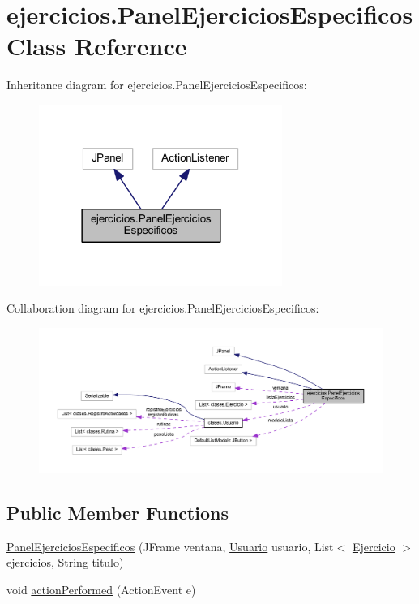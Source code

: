 \hypertarget{classejercicios_1_1_panel_ejercicios_especificos}{}\section{ejercicios.\+Panel\+Ejercicios\+Especificos Class Reference}
\label{classejercicios_1_1_panel_ejercicios_especificos}


Inheritance diagram for ejercicios.\+Panel\+Ejercicios\+Especificos\+:
\nopagebreak
\begin{figure}[H]
\begin{center}
\leavevmode
\includegraphics[width=225pt]{classejercicios_1_1_panel_ejercicios_especificos__inherit__graph}
\end{center}
\end{figure}


Collaboration diagram for ejercicios.\+Panel\+Ejercicios\+Especificos\+:
\nopagebreak
\begin{figure}[H]
\begin{center}
\leavevmode
\includegraphics[width=350pt]{classejercicios_1_1_panel_ejercicios_especificos__coll__graph}
\end{center}
\end{figure}
\subsection*{Public Member Functions}
\begin{DoxyCompactItemize}
\item 
\mbox{\hyperlink{classejercicios_1_1_panel_ejercicios_especificos_aeb045d323226f07b25580f3900914c97}{Panel\+Ejercicios\+Especificos}} (J\+Frame ventana, \mbox{\hyperlink{classclases_1_1_usuario}{Usuario}} usuario, List$<$ \mbox{\hyperlink{classclases_1_1_ejercicio}{Ejercicio}} $>$ ejercicios, String titulo)
\item 
void \mbox{\hyperlink{classejercicios_1_1_panel_ejercicios_especificos_a881689ee370e508005fda67b729e23f7}{action\+Performed}} (Action\+Event e)
\end{DoxyCompactItemize}


